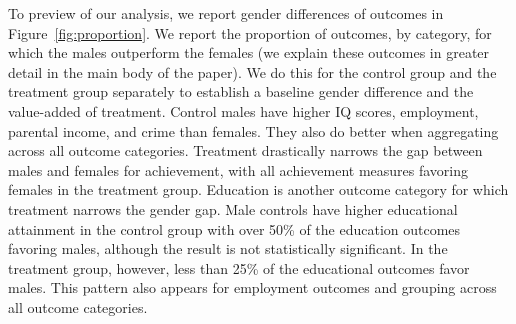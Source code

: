 To preview of our analysis, we report gender differences of outcomes in Figure~\ref{fig:proportion}. We report the proportion of outcomes, by category, for which the males outperform the females (we explain these outcomes in greater detail in the main body of the paper). We do this for the control group and the treatment group separately to establish a baseline gender difference and the value-added of treatment. Control males have higher IQ scores, employment, parental income, and crime than females. They also do better when aggregating across all outcome categories. Treatment drastically narrows the gap between males and females for achievement, with all achievement measures favoring females in the treatment group. Education is another outcome category for which treatment narrows the gender gap. Male controls have higher educational attainment in the control group with over 50\% of the education outcomes favoring males, although the result is not statistically significant. In the treatment group, however, less than 25\% of the educational outcomes favor males. This pattern also appears for employment outcomes and grouping across all outcome categories. 

